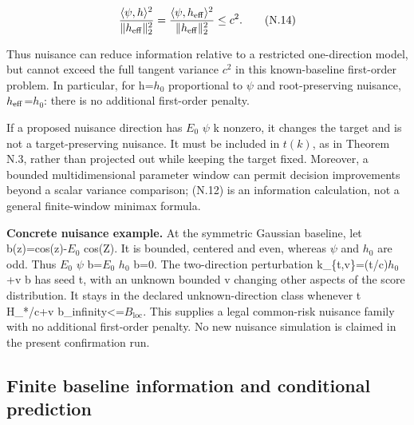 \[
\frac{\langle\psi,h\rangle^2}{\|h_{\rm eff}\|_2^2}
=\frac{\langle\psi,h_{\rm eff}\rangle^2}{\|h_{\rm eff}\|_2^2}
\le c^2.
\tag{N.14}
\]

Thus nuisance can reduce information relative to a restricted one-direction model, but cannot exceed the full tangent variance \(c^2\) in this known-baseline first-order problem. In particular, for h=\(h_0\) proportional to \(\psi\) and root-preserving nuisance, \(h_{\rm eff}\)=\(h_0\): there is no additional first-order penalty.

If a proposed nuisance direction has \(E_0\) \(\psi\) k nonzero, it changes the target and is not a target-preserving nuisance. It must be included in \(t(k)\), as in Theorem N.3, rather than projected out while keeping the target fixed. Moreover, a bounded multidimensional parameter window can permit decision improvements beyond a scalar variance comparison; (N.12) is an information calculation, not a general finite-window minimax formula.

\textbf{Concrete nuisance example.} At the symmetric Gaussian baseline, let b(z)=cos(z)-\(E_0\) cos(Z). It is bounded, centered and even, whereas \(\psi\) and \(h_0\) are odd. Thus \(E_0\) \(\psi\) b=\(E_0\) \(h_0\) b=0. The two-direction perturbation k\_\{t,v\}=(t/c)\(h_0\)+v b has seed t, with an unknown bounded v changing other aspects of the score distribution. It stays in the declared unknown-direction class whenever \textbar t\textbar{} H\_*/c+\textbar v\textbar{} \textbar\textbar b\textbar\textbar\_infinity\textless=\(B_{\mathrm{loc}}\). This supplies a legal common-risk nuisance family with no additional first-order penalty. No new nuisance simulation is claimed in the present confirmation run.

\subsection{Finite baseline information and conditional
prediction}\label{finite-baseline-information-and-conditional-prediction}

